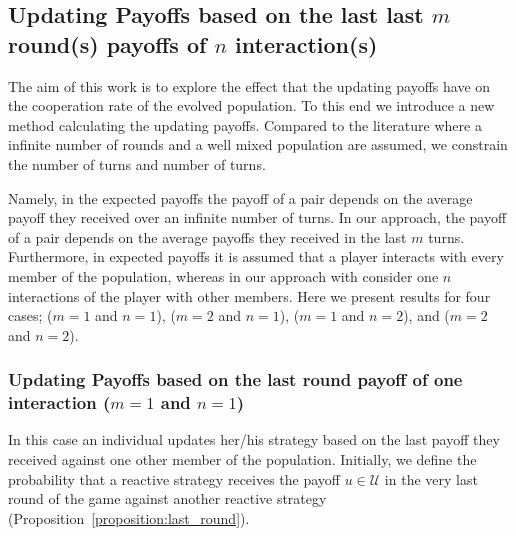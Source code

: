 \documentclass[11pt]{article}
\theoremstyle{plainCl1}
\theoremstyle{plainCl2}
\begin{document}
\subsection{Updating Payoffs based on the last last \(m\) round(s) payoffs of \(n\) interaction(s)}

The aim of this work is to explore the effect that the updating payoffs have on
the cooperation rate of the evolved population. To this end we introduce
a new method calculating the updating payoffs. Compared to the literature
where a infinite number of rounds and a well mixed population are assumed,
we constrain the number of turns and number of turns.

Namely, in the expected payoffs the payoff of a pair depends on the average
payoff they received over an infinite number of turns. In our approach, the
payoff of a pair depends on the average payoffs they received in the last \(m\)
turns. Furthermore, in expected payoffs it is assumed that a player interacts
with every member of the population, whereas in our approach with consider one
\(n\) interactions of the player with other members. Here we present results for
four cases; (\(m=1\) and \(n=1\)), (\(m=2\) and \(n=1\)), (\(m=1\) and \(n=2\)),
and (\(m=2\) and \(n=2\)).

\subsubsection{Updating Payoffs based on the last round payoff of one interaction (\(m=1\) and \(n=1\))}\label{section:m_one_n_one}

In this case an individual updates her/his strategy based on the last payoff
they received against one other member of the population. Initially, we define
the probability that a reactive strategy receives the payoff $u\!\in\!
\mathcal{U}$ in the very last round of the game against another reactive
strategy (Proposition~\ref{proposition:last_round}).
\end{document}
